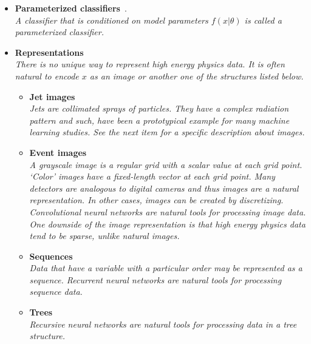\documentclass[12pt,letterpaper]{article}
\begin{document}
\begin{itemize}
	\begin{itemize}
		\item \textbf{Parameterized classifiers}~\cite{Baldi:2016fzo,Cranmer:2015bka,Nachman:2021yvi}.
			\\\textit{A classifier that is conditioned on model parameters $f(x|\theta)$ is called a parameterized classifier.}
		\item \textbf{Representations}
			\\\textit{There is no unique way to represent high energy physics data.  It is often natural to encode $x$ as an image or another one of the structures listed below.}
			\begin{itemize}
				\item \textbf{Jet images}~\cite{Pumplin:1991kc,Cogan:2014oua,Almeida:2015jua,deOliveira:2015xxd,ATL-PHYS-PUB-2017-017,Lin:2018cin,Komiske:2018oaa,Barnard:2016qma,Komiske:2016rsd,Kasieczka:2017nvn,Macaluso:2018tck,li2020reconstructing,li2020attention,Lee:2019cad,collado2021learning,Du:2020pmp,Filipek:2021qbe}
				\\\textit{Jets are collimated sprays of particles.  They have a complex radiation pattern and such, have been a prototypical example for many machine learning studies.  See the next item for a specific description about images.}
				\item \textbf{Event images}~\cite{Nguyen:2018ugw,ATL-PHYS-PUB-2019-028,Lin:2018cin,Andrews:2018nwy,Chung:2020ysf,Du:2019civ,Andrews:2021ejw,Pol:2021iqw,Bae:2022dnw}
				\\\textit{A grayscale image is a regular grid with a scalar value at each grid point.  `Color' images have a fixed-length vector at each grid point.  Many detectors are analogous to digital cameras and thus images are a natural representation.  In other cases, images can be created by discretizing.   Convolutional neural networks are natural tools for processing image data.  One downside of the image representation is that high energy physics data tend to be sparse, unlike natural images.}
				\item \textbf{Sequences}~\cite{Guest:2016iqz,Nguyen:2018ugw,Bols:2020bkb,goto2021development,deLima:2021fwm,ATL-PHYS-PUB-2017-003}
				\\\textit{Data that have a variable with a particular order may be represented as a sequence.  Recurrent neural networks are natural tools for processing sequence data. }
				\item \textbf{Trees}~\cite{Louppe:2017ipp,Cheng:2017rdo,Jercic:2021bfc}
				\\\textit{Recursive neural networks are natural tools for processing data in a tree structure.}

\end{itemize}
\end{itemize}
\end{itemize}
\end{document}

